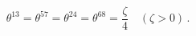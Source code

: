 \begin{equation}
 \theta^{13}=\theta^{57}=\theta^{24}=\theta^{68}=\frac{\zeta}{4} 
\quad (\zeta >0) \,.\label{eq:5.1}
\end{equation}

